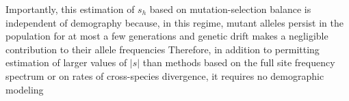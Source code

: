 \documentclass[11pt]{article}
\begin{document}
Importantly, this estimation of $s_h$ based on mutation-selection balance
is independent of demography because, in this regime, mutant alleles persist in the population for at most a few generations 
and genetic drift makes a negligible contribution to their allele frequencies
Therefore, in addition to permitting estimation of larger values of $|s|$ than methods based on the full site frequency spectrum or on rates of cross-species divergence, it requires no demographic modeling



\end{document}
